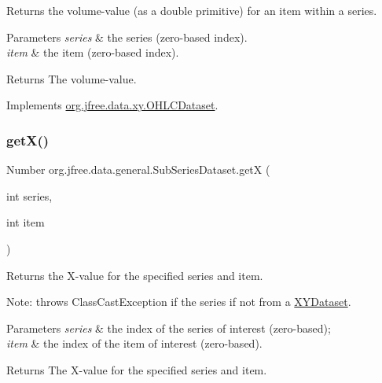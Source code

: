 Returns the volume-\/value (as a double primitive) for an item within a series.


\begin{DoxyParams}{Parameters}
{\em series} & the series (zero-\/based index). \\
\hline
{\em item} & the item (zero-\/based index).\\
\hline
\end{DoxyParams}
\begin{DoxyReturn}{Returns}
The volume-\/value. 
\end{DoxyReturn}


Implements \mbox{\hyperlink{interfaceorg_1_1jfree_1_1data_1_1xy_1_1_o_h_l_c_dataset_a132a37218de3b54bf308b3dcfb93cf84}{org.\+jfree.\+data.\+xy.\+O\+H\+L\+C\+Dataset}}.

\mbox{\label{classorg_1_1jfree_1_1data_1_1general_1_1_sub_series_dataset_a5cd509f1412767a8630a4f0440508b64}} 
\subsubsection{\texorpdfstring{get\+X()}{getX()}}
{\footnotesize\ttfamily Number org.\+jfree.\+data.\+general.\+Sub\+Series\+Dataset.\+getX (\begin{DoxyParamCaption}\item[{int}]{series,  }\item[{int}]{item }\end{DoxyParamCaption})}

Returns the X-\/value for the specified series and item. 

Note\+: throws {\ttfamily Class\+Cast\+Exception} if the series if not from a \mbox{\hyperlink{}{X\+Y\+Dataset}}.


\begin{DoxyParams}{Parameters}
{\em series} & the index of the series of interest (zero-\/based); \\
\hline
{\em item} & the index of the item of interest (zero-\/based).\\
\hline
\end{DoxyParams}
\begin{DoxyReturn}{Returns}
The X-\/value for the specified series and item. 
\end{DoxyReturn}


